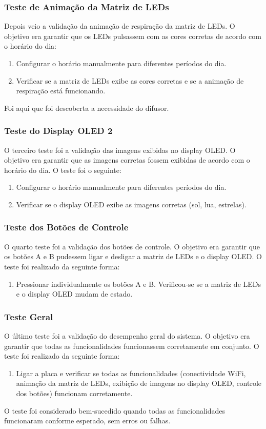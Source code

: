 \documentclass[12pt]{article}
\begin{document}
\subsubsection{Teste de Animação da Matriz de LEDs}
Depois veio a validação da animação de respiração da matriz de LEDs. O objetivo era garantir que os LEDs pulsassem com as cores corretas de acordo com o horário do dia:
\begin{enumerate}
    \item Configurar o horário manualmente para diferentes períodos do dia.
    \item Verificar se a matriz de LEDs exibe as cores corretas e se a animação de respiração está funcionando.
\end{enumerate}
Foi aqui que foi descoberta a necessidade do difusor.

\subsubsection{Teste do Display OLED 2}
O terceiro teste foi a validação das imagens exibidas no display OLED. O objetivo era garantir que as imagens corretas fossem exibidas de acordo com o horário do dia. O teste foi o seguinte:
\begin{enumerate}
    \item Configurar o horário manualmente para diferentes períodos do dia.
    \item Verificar se o display OLED exibe as imagens corretas (sol, lua, estrelas).
\end{enumerate}

\subsubsection{Teste dos Botões de Controle}
O quarto teste foi a validação dos botões de controle. O objetivo era garantir que os botões A e B pudessem ligar e desligar a matriz de LEDs e o display OLED. O teste foi realizado da seguinte forma:
\begin{enumerate}
    \item Pressionar individualmente os botões A e B. Verificou-se se a matriz de LEDs e o display OLED mudam de estado.
\end{enumerate}

\subsubsection{Teste Geral}
O último teste foi a validação do desempenho geral do sistema. O objetivo era garantir que todas as funcionalidades funcionassem corretamente em conjunto. O teste foi realizado da seguinte forma:
\begin{enumerate}
    \item Ligar a placa e verificar se todas as funcionalidades (conectividade WiFi, animação da matriz de LEDs, exibição de imagens no display OLED, controle dos botões) funcionam corretamente.
\end{enumerate}
O teste foi considerado bem-sucedido quando todas as funcionalidades funcionaram conforme esperado, sem erros ou falhas.
\end{document}
